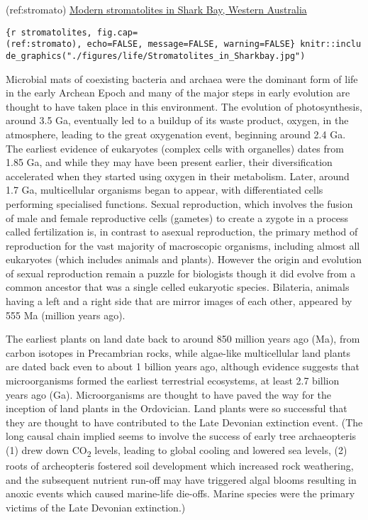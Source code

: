 \documentclass[
]{article}
\begin{document}
(ref:stromato)
\href{https://commons.wikimedia.org/wiki/File:Stromatolites_in_Sharkbay.jpg}{Modern
stromatolites in Shark Bay, Western Australia}

\texttt{\{r\ stromatolites,\ fig.cap=\textquotesingle{}(ref:stromato)\textquotesingle{},\ echo=FALSE,\ message=FALSE,\ warning=FALSE\}\ knitr::include\_graphics("./figures/life/Stromatolites\_in\_Sharkbay.jpg")}

Microbial mats of coexisting bacteria and archaea were the dominant form
of life in the early Archean Epoch and many of the major steps in early
evolution are thought to have taken place in this environment. The
evolution of photosynthesis, around 3.5 Ga, eventually led to a buildup
of its waste product, oxygen, in the atmosphere, leading to the great
oxygenation event, beginning around 2.4 Ga. The earliest evidence of
eukaryotes (complex cells with organelles) dates from 1.85 Ga, and while
they may have been present earlier, their diversification accelerated
when they started using oxygen in their metabolism. Later, around 1.7
Ga, multicellular organisms began to appear, with differentiated cells
performing specialised functions. Sexual reproduction, which involves
the fusion of male and female reproductive cells (gametes) to create a
zygote in a process called fertilization is, in contrast to asexual
reproduction, the primary method of reproduction for the vast majority
of macroscopic organisms, including almost all eukaryotes (which
includes animals and plants). However the origin and evolution of sexual
reproduction remain a puzzle for biologists though it did evolve from a
common ancestor that was a single celled eukaryotic species. Bilateria,
animals having a left and a right side that are mirror images of each
other, appeared by 555 Ma (million years ago).

The earliest plants on land date back to around 850 million years ago
(Ma), from carbon isotopes in Precambrian rocks, while algae-like
multicellular land plants are dated back even to about 1 billion years
ago, although evidence suggests that microorganisms formed the earliest
terrestrial ecosystems, at least 2.7 billion years ago (Ga).
Microorganisms are thought to have paved the way for the inception of
land plants in the Ordovician. Land plants were so successful that they
are thought to have contributed to the Late Devonian extinction event.
(The long causal chain implied seems to involve the success of early
tree archaeopteris (1) drew down CO\textsubscript{2} levels, leading to
global cooling and lowered sea levels, (2) roots of archeopteris
fostered soil development which increased rock weathering, and the
subsequent nutrient run-off may have triggered algal blooms resulting in
anoxic events which caused marine-life die-offs. Marine species were the
primary victims of the Late Devonian extinction.)
\end{document}
